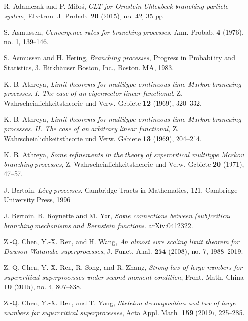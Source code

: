 \documentclass[EJP]{ejpecp} %
\begin{document}
\begin{thebibliography}{10}

  R. Adamczak and P. Mi{\l}o\'{s}, \emph{C{LT} for {O}rnstein-{U}hlenbeck branching particle system},
  Electron. J. Probab. \textbf{20} (2015), no. 42, 35 pp.

  S. Asmussen, \emph{Convergence rates for branching processes},
  Ann. Probab.  \textbf{4} (1976), no. 1, 139--146.

  S. Asmussen and H. Hering, \emph{Branching processes},
  Progress in Probability and Statistics, 3. Birkh\"{a}user Boston, Inc., Boston, MA, 1983.

  K. B. Athreya,
  \emph{Limit theorems for multitype continuous time {M}arkov branching processes. {I}. {T}he case of an eigenvector linear functional},
  Z. Wahrscheinlichkeitstheorie und Verw. Gebiete \textbf{12} (1969), 320--332.

  K. B. Athreya,
  \emph{Limit theorems for multitype continuous time {M}arkov branching processes. {II}. {T}he case of an arbitrary linear functional},
  Z. Wahrscheinlichkeitstheorie und Verw. Gebiete \textbf{13} (1969), 204--214.

  K. B. Athreya,
  \emph{Some refinements in the theory of supercritical multitype {M}arkov branching processes},
  Z. Wahrscheinlichkeitstheorie und Verw. Gebiete \textbf{20} (1971), 47--57.


J. Bertoin,
\emph{L\'evy processes}.
Cambridge Tracts in Mathematics, 121. Cambridge
University Press, 1996.

J. Bertoin, B. Roynette and M. Yor,
\emph{Some connections between (sub)critical branching mechanisms and Bernstein functions}.
arXiv:0412322.


  Z.-Q. Chen, Y.-X. Ren, and H. Wang,
  \emph{An almost sure scaling limit theorem for {D}awson-{W}atanabe superprocesses},
  J. Funct. Anal. \textbf{254} (2008), no. 7, 1988--2019.

   Z.-Q. Chen, Y.-X. Ren, R. Song, and R. Zhang,
   \emph{Strong law of large numbers for supercritical superprocesses under second moment condition},
   Front. Math. China \textbf{10} (2015), no. 4, 807--838.

   Z.-Q. Chen, Y.-X. Ren, and T. Yang,
   \emph{Skeleton decomposition and law of large numbers for supercritical superprocesses},
   Acta Appl. Math. \textbf{159} (2019), 225--285.


\end{thebibliography}
\end{document}

